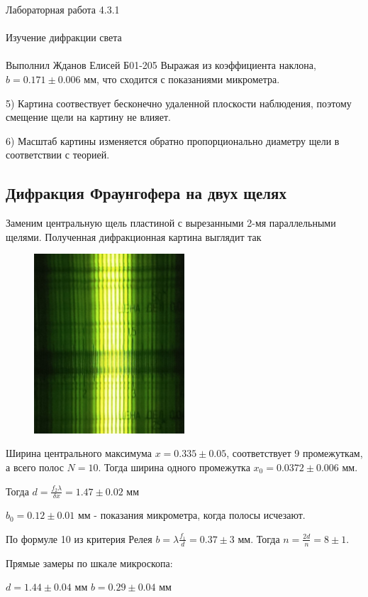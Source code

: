 \documentclass{astroedu-lab}
\begin{document}
\begin{problem}{\huge Лабораторная работа 4.3.1\\\\Изучение дифракции света\\\\Выполнил Жданов Елисей Б01-205}
Выражая из коэффициента наклона, $b = 0.171 \pm 0.006$ мм, что сходится с показаниями микрометра.

5) Картина соотвествует бесконечно удаленной плоскости наблюдения, поэтому смещение щели на картину не влияет.

6) Масштаб картины изменяется обратно пропорционально диаметру щели в соответствии с теорией.

\subsection{Дифракция Фраунгофера на двух щелях}

Заменим центральную щель пластиной с вырезанными 2-мя параллельными щелями. Полученная дифракционная картина выглядит так

\begin{figure}[!h]
	\centering
	\includegraphics[width=0.5\textwidth]{2_fraun.jpg}
	\label{fig:boiler}
\end{figure}

\newpage

Ширина центрального максимума $x = 0.335 \pm 0.05$, соответствует 9 промежуткам, а всего полос $N = 10$. Тогда ширина одного промежутка $x_0 = 0.0372 \pm 0.006$ мм.

Тогда $d = \frac{f_2 \lambda}{\delta x} = 1.47 \pm 0.02$ мм

$b_0 = 0.12 \pm 0.01$ мм - показания микрометра, когда полосы исчезают. 

По формуле 10 из критерия Релея $b = \lambda \frac{f_1}{d} = 0.37 \pm 3$ мм. Тогда $n = \frac{2 d}{n} = 8 \pm 1$.

Прямые замеры по шкале микроскопа:

$d = 1.44 \pm 0.04$ мм
$b = 0.29 \pm 0.04$ мм


\end{problem}
\end{document}
